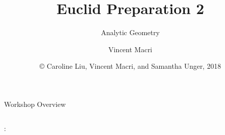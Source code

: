 

\usepackage{cleveref}

\title{Euclid Preparation 2}
\subtitle{Analytic Geometry}
\author{Vincent Macri}
\date{\copyright{} Caroline Liu, Vincent Macri, and Samantha Unger, 2018}

\renewcommand\thepart{\Roman{part}}


	\frame{\titlepage}
	\begin{namedframe}{Workshop Overview}
		\begin{columns}[t]
			\begin{column}{0.5\textwidth}
				:
				\newline
				\tableofcontents[part=1]
			\end{column}
		\end{columns}
	\end{namedframe}
	


